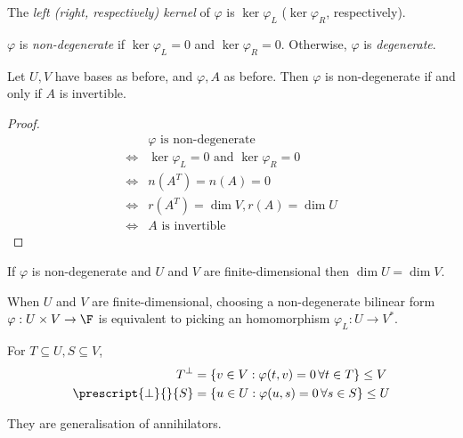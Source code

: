 \documentclass[a4paper]{article}
\theoremstyle{definition}
\begin{document}
\begin{definition}
  The \emph{left (right, respectively) kernel} of \(\varphi\) is \(\ker \varphi_L\) (\(\ker \varphi_R\), respectively).
\end{definition}

\begin{definition}[Degeneracy]
  \(\varphi\) is \emph{non-degenerate} if \(\ker \varphi_L = 0\) and \(\ker \varphi_R = 0\). Otherwise, \(\varphi\) is \emph{degenerate}.
\end{definition}

\begin{lemma}
  Let \(U, V\) have bases as before, and \(\varphi, A\) as before. Then \(\varphi\) is non-degenerate if and only if \(A\) is invertible.
\end{lemma}

\begin{proof}
  \begin{align*}
    & \varphi \text{ is non-degenerate} \\
    \Leftrightarrow & \ker \varphi_L = 0 \text{ and } \ker \varphi_R = 0 \\
    \Leftrightarrow & n(A^T) = n(A) = 0 \\
    \Leftrightarrow & r(A^T) = \dim V, r(A) = \dim U \\
    \Leftrightarrow & A \text{ is invertible}
  \end{align*}
\end{proof}

\begin{corollary}
  If \(\varphi\) is non-degenerate and \(U\) and \(V\) are finite-dimensional then \(\dim U = \dim V\).
\end{corollary}

\begin{corollary}
  When \(U\) and \(V\) are finite-dimensional, choosing a non-degenerate bilinear form \(\varphi: U \times V \to \F\) is equivalent to picking an homomorphism \(\varphi_L: U \to V^*\).
\end{corollary}

\begin{definition}
  For \(T \subseteq U, S \subseteq V\),
  \begin{align*}
    T^\perp &= \{ v\in V: \varphi(t, v) = 0 \, \forall t\in T \} \leq V \\
    \prescript{\perp}{}{S} &= \{ u\in U: \varphi(u, s) = 0 \, \forall s\in S \} \leq U
  \end{align*}
\end{definition}
They are generalisation of annihilators.
\end{document}
